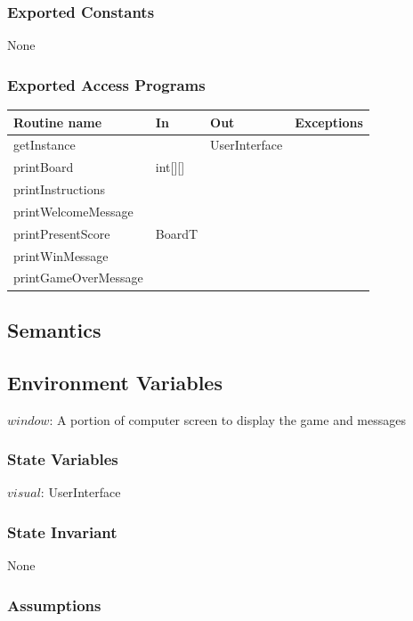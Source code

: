 \documentclass[12pt]{article}
\begin{document}
\subsubsection* {Exported Constants}

None

\subsubsection* {Exported Access Programs}

\begin{tabular}{| l | l | l | p{6cm} |}
\hline
\textbf{Routine name} & \textbf{In} & \textbf{Out} & \textbf{Exceptions}\\
\hline
getInstance & ~ & UserInterface &  \\
\hline
printBoard & int[][] & ~ & \\
\hline
printInstructions & ~ & ~ & \\
\hline
printWelcomeMessage & ~ & ~ & \\
\hline
printPresentScore & BoardT & ~ & \\
\hline
printWinMessage & ~ & ~ & \\
\hline
printGameOverMessage & ~ & ~ & \\
\hline
\end{tabular}

\subsection* {Semantics}

\subsection*{Environment Variables}

$window$: A portion of computer screen to display the game and messages

\subsubsection* {State Variables}

$visual$: UserInterface

\subsubsection* {State Invariant}

None

\subsubsection* {Assumptions}
\end{document}

